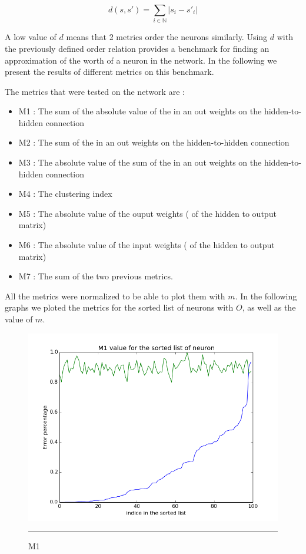 $$ d(s , s') =  \sum_{i \in \mathbb{N}} {| s_i - s'_i|} $$

A low value of $d$ means that 2 metrics order the neurons similarly. Using $d$ with the previously defined order relation provides a benchmark for finding an approximation of the worth of a neuron in the network. In the following we present the results of different metrics on this benchmark.

The metrics that were tested on the network are : 
\begin{itemize}
    \item M1 : The sum of the absolute value of the in an out weights on the hidden-to-hidden connection
    \item M2 : The sum of the in an out weights on the hidden-to-hidden connection
    \item M3 : The absolute value of the sum of the in an out weights on the hidden-to-hidden connection
    \item M4 : The clustering index
    \item M5 : The absolute value of the ouput weights ( of the hidden to output matrix) 
    \item M6 : The absolute value of the input weights ( of the hidden to output matrix) 
    \item M7 : The sum of the two previous metrics.
\end{itemize}
\newpage

All the metrics were normalized to be able to plot them with $m$.
In the following graphs we ploted the metrics for the sorted list of neurons with $O$, as well as the value of $m$. 


\begin{figure}[!htb]
    \centering
    \includegraphics[scale=0.5]{Figures/m1.png}
    \rule{35em}{0.5pt}
    \caption[M1]{M1}
    \label{fig:m1}
\end{figure}


